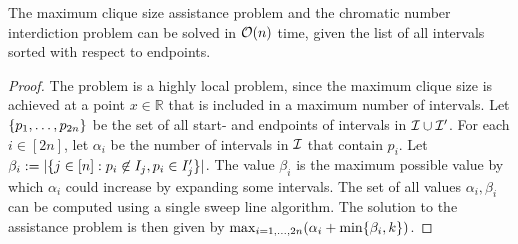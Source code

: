 \begin{theorem}\label{thm:clique:assistance}
    The maximum clique size assistance problem and the chromatic number interdiction problem  can be solved in $\mathcal{O}(n)$ time, given the list of all intervals sorted with respect to endpoints. 
\end{theorem}
\begin{proof}
The problem is a highly local problem, since the maximum clique size is achieved at a point 
$x \in \mathbb{R}$ that is included in a maximum number of intervals.
Let $\{ p_1, \ldots, p_{2n} \}$ be the set of all start- and endpoints of intervals in $\mathcal{I} \cup \mathcal{I}'$. For each $i \in [2n]$, let $\alpha_i$ be the number of intervals in $\mathcal{I}$ that contain $p_i$. Let $\beta_i := |\{ j \in [n] : p_i \not\in I_j, p_i \in I'_j \}|$. The value $\beta_i$ is the maximum possible value by which $\alpha_i$ could increase by expanding some intervals. The set of all values $\alpha_i, \beta_i$ can be computed using a single sweep line algorithm. The solution to the assistance problem is then given by $\max_{i=1,\dots,2n} (\alpha_i + \min\{ \beta_i,k \})$.
 \end{proof}



%

